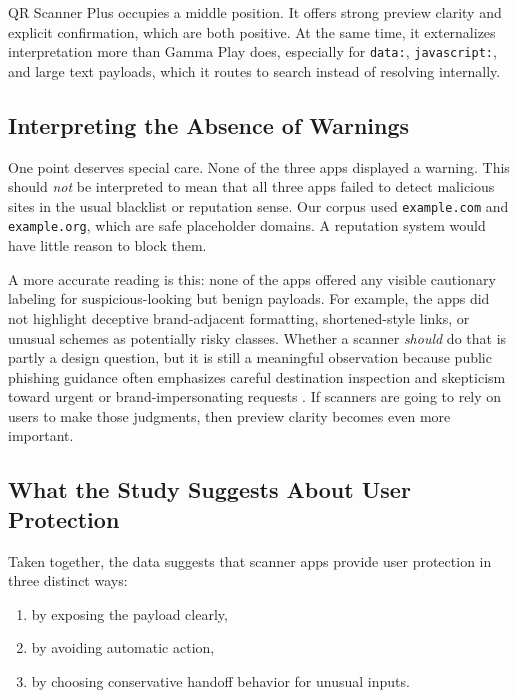 \documentclass[11pt]{article}
\begin{document}
QR Scanner Plus occupies a middle position. It offers strong preview clarity and explicit confirmation, which are both positive. At the same time, it externalizes interpretation more than Gamma Play does, especially for \texttt{data:}, \texttt{javascript:}, and large text payloads, which it routes to search instead of resolving internally.

\subsection{Interpreting the Absence of Warnings}

One point deserves special care. None of the three apps displayed a warning. This should \emph{not} be interpreted to mean that all three apps failed to detect malicious sites in the usual blacklist or reputation sense. Our corpus used \texttt{example.com} and \texttt{example.org}, which are safe placeholder domains. A reputation system would have little reason to block them.

A more accurate reading is this: none of the apps offered any visible cautionary labeling for suspicious-looking but benign payloads. For example, the apps did not highlight deceptive brand-adjacent formatting, shortened-style links, or unusual schemes as potentially risky classes. Whether a scanner \emph{should} do that is partly a design question, but it is still a meaningful observation because public phishing guidance often emphasizes careful destination inspection and skepticism toward urgent or brand-impersonating requests \cite{cisa-phishing,nist-phishing,aha-quishing}. If scanners are going to rely on users to make those judgments, then preview clarity becomes even more important.

\subsection{What the Study Suggests About User Protection}

Taken together, the data suggests that scanner apps provide user protection in three distinct ways:
\begin{enumerate}[leftmargin=1.5em]
    \item by exposing the payload clearly,
    \item by avoiding automatic action,
    \item by choosing conservative handoff behavior for unusual inputs.
\end{enumerate}
\end{document}
